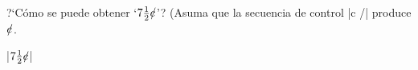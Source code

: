 
\def\cents{c \kern -1.4mm /}

\bigskip

\enunciadoS ?`C\'omo se puede obtener `$7{1 \over 2}\cents$'? (Asuma
que la secuencia de control |\cents| produce $\cents$\/.

\bigskip

\respuestaS |$7{1 \over 2}\cents$|

\bye

